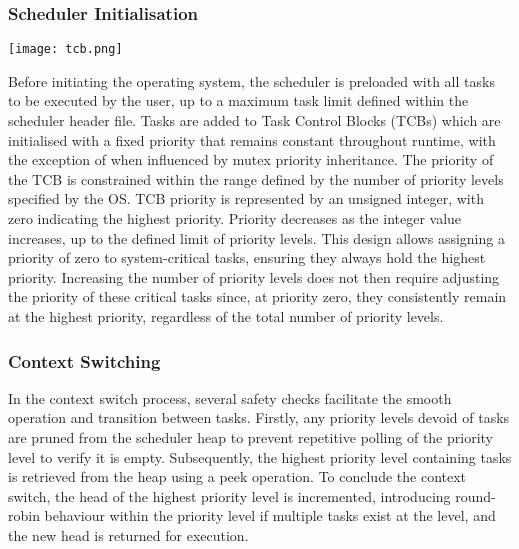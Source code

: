 \subsubsection{Scheduler Initialisation}
\begin{center}
	\texttt{[image: tcb.png]}
\end{center}
Before initiating the operating system, the scheduler is preloaded with all tasks to be executed by the user, up to a maximum task limit defined within the scheduler header file. Tasks are added to Task Control Blocks (TCBs) which are initialised with a fixed priority that remains constant throughout runtime, with the exception of when influenced by mutex priority inheritance. The priority of the TCB is constrained within the range defined by the number of priority levels specified by the OS.\hfill\newline
TCB priority is represented by an unsigned integer, with zero indicating the highest priority. Priority decreases as the integer value increases, up to the defined limit of priority levels. This design allows assigning a priority of zero to system-critical tasks, ensuring they always hold the highest priority. Increasing the number of priority levels does not then require adjusting the priority of these critical tasks since, at priority zero, they consistently remain at the highest priority, regardless of the total number of priority levels. 
 
\subsubsection{Context Switching}
In the context switch process, several safety checks facilitate the smooth operation and transition between tasks. Firstly, any priority levels devoid of tasks are pruned from the scheduler heap to prevent repetitive polling of the priority level to verify it is empty. Subsequently, the highest priority level containing tasks is retrieved from the heap using a peek operation.\hfill\newline
To conclude the context switch, the head of the highest priority level is incremented, introducing round-robin behaviour within the priority level if multiple tasks exist at the level, and the new head is returned for execution. 

\pagebreak

